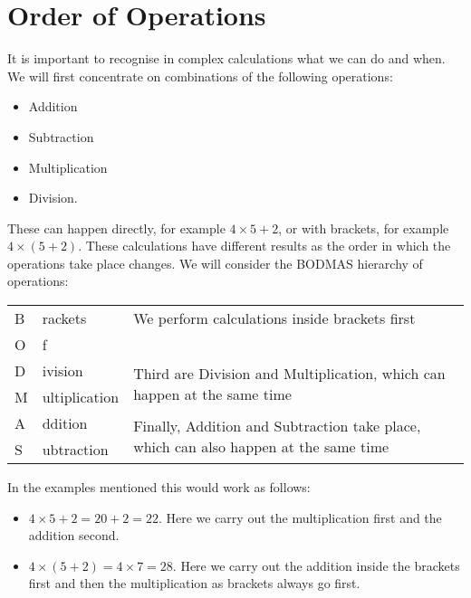 \documentclass[11pt, oneside]{article}
\theoremstyle{definition}
\begin{document}
\section{Order of Operations}

It is important to recognise in complex calculations what we can do and when. We will first concentrate on combinations of the following operations:

\begin{itemize}
\item Addition
\item Subtraction
\item Multiplication
\item Division.
\end{itemize}

These can happen directly, for example $4\times 5 + 2$, or with brackets, for example $4\times (5 + 2)$. These calculations have different results as the order in which the operations take place changes. We will consider the BODMAS hierarchy of operations:

\begin{table}[H]
\begin{tabular}{p{0.3cm}p{2.5cm}p{9cm}}
B & rackets       & We perform calculations inside brackets first                            \\
O & f          &         \\ %
D & ivision       & \multirow{2}{*}{Third are Division and Multiplication, which can happen at the same time} \\
M & ultiplication &                                                                          \\
A & ddition       & \multirow{2}{*}{Finally, Addition and Subtraction take place, which can also happen at the same time}    \\
S & ubtraction    &                                                                         
\end{tabular}
\end{table}

In the examples mentioned this would work as follows:

\begin{itemize}
\item $4\times 5 + 2 = 20 + 2 = 22$.
Here we carry out the multiplication first and the addition second.

\item $4\times (5 + 2) = 4\times 7 = 28$.
Here we carry out the addition inside the brackets first and then the multiplication as brackets always go first.
\end{itemize}
\end{document}

